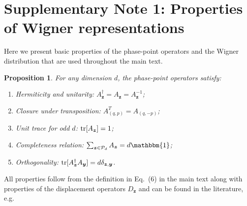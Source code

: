 \documentclass[
twocolumn,
superscriptaddress
]{revtex4-1}
\newtheorem{proposition}[theorem]{Proposition}
\def\id{\mathbbm{1}}
\renewcommand{\tr}{{\rm{tr}}}
\def\y{\boldsymbol{y}}
\def\z{\boldsymbol{z}}
\renewcommand{\P}{{\cal P}}
\begin{document}
\section*{Supplementary Note 1: Properties of Wigner representations}

Here we present basic properties of the phase-point operators and the Wigner distribution that are used throughout the main text.

\begin{proposition}\label{thm:aproperties}
    For any dimension $d$, the phase-point operators satisfy:
    \begin{enumerate}
        \item[(i)]\label{en:a1} Hermiticity and unitarity: $A_{\z}^\dagger = A_{\z} = A_{\z}^{-1}$;
	    \item[(ii)]\label{en:a2} Closure under transposition: $A_{(q, p)}^T = A_{(q, -p)}$;
	    \item[(iii)]\label{en:a3} Unit trace for odd $d$: $\tr[A_{\z}] = 1$;
	    \item[(iv)]\label{en:a4} Completeness relation: $\sum_{\z \in \P_d} A_{\z} = d\id$;
	    \item[(i)]\label{en:a5} Orthogonality: $\tr[A_{\z}^\dagger A_{\y}] = d \delta_{\z,\y}$.
	\end{enumerate}
\end{proposition}
All properties follow from the definition in Eq.~(6) in the main text along with properties of the displacement operators $D_{\z}$ and can be found in the literature, e.g.~\cite{cit:veitch,Vourdas_2004,Gross2006}
\end{document}
